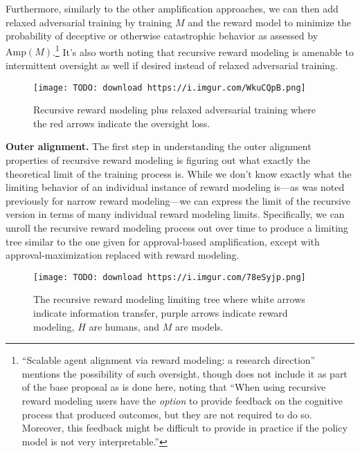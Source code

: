 \documentclass[
  onecolumn,
  natbib,
]{miri-tech-article}
\begin{document}
Furthermore, similarly to the other amplification approaches, we can then add relaxed adversarial training by training $M$ and the reward model to minimize the probability of deceptive\cite{TODO: cite https://www.alignmentforum.org/posts/zthDPAjh9w6Ytbeks/deceptive-alignment} or otherwise catastrophic\cite{TODO: cite https://ai-alignment.com/learning-with-catastrophes-59387b55cc30} behavior as assessed by $\text{Amp}(M)$.\footnote{``Scalable agent alignment via reward modeling: a research direction\cite{TODO: cite https://arxiv.org/abs/1811.07871}'' mentions the possibility of such oversight, though does not include it as part of the base proposal as is done here, noting that ``When using recursive reward modeling users have the \textit{option} to provide feedback on the cognitive process that produced outcomes, but they are not required to do so. Moreover, this feedback might be difficult to provide in practice if the policy model is not very interpretable.''} It's also worth noting that recursive reward modeling is amenable to intermittent oversight as well if desired instead of relaxed adversarial training.

\begin{figure}[h!]
  \centering
  \texttt{[image: TODO: download https://i.imgur.com/WkuCQpB.png]}
  \caption{Recursive reward modeling plus relaxed adversarial training where the red arrows indicate the oversight loss.}
\end{figure}

\textbf{Outer alignment.} The first step in understanding the outer alignment properties of recursive reward modeling is figuring out what exactly the theoretical limit of the training process is. While we don't know exactly what the limiting behavior of an individual instance of reward modeling is---as was noted previously for narrow reward modeling---we can express the limit of the recursive version in terms of many individual reward modeling limits. Specifically, we can unroll the recursive reward modeling process out over time to produce a limiting tree similar to the one given for approval-based amplification, except with approval-maximization replaced with reward modeling.

\begin{figure}[h!]
  \centering
  \texttt{[image: TODO: download https://i.imgur.com/78eSyjp.png]}
  \caption{The recursive reward modeling limiting tree where white arrows indicate information transfer, purple arrows indicate reward modeling, $H$ are humans, and $M$ are models.}
\end{figure}
\end{document}

